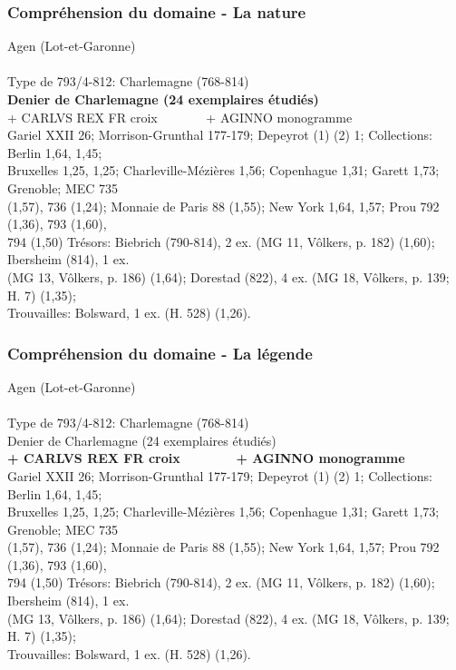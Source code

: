 \documentclass[10pt, compress]{beamer}
\begin{document}
\begin{frame}[fragile]
  \frametitle{Compréhension du domaine - La nature}
  \begin{scriptsize}
\textcolor{light_gray}{Agen (Lot-et-Garonne)}\\~\\

\textcolor{light_gray}{Type de 793/4-812: Charlemagne (768-814)}\\

\textbf{Denier de Charlemagne (24 exemplaires étudiés)}\\
\textcolor{light_gray}{
+ CARLVS REX FR croix~~~~~~~ + AGINNO monogramme\\
Gariel XXII 26; Morrison-Grunthal 177-179; Depeyrot (1) (2) 1; Collections: Berlin 1,64, 1,45; \\
Bruxelles 1,25, 1,25; Charleville-Mézières 1,56; Copenhague 1,31; Garett 1,73; Grenoble; MEC 735 \\
(1,57), 736 (1,24); Monnaie de Paris 88 (1,55); New York 1,64, 1,57; Prou 792 (1,36), 793 (1,60), \\
794 (1,50) Trésors: Biebrich (790-814), 2 ex. (MG 11, Vôlkers, p. 182) (1,60); Ibersheim (814), 1 ex. \\
(MG 13, Vôlkers, p. 186) (1,64); Dorestad (822), 4 ex. (MG 18, Vôlkers, p. 139; H. 7) (1,35); \\Trouvailles: Bolsward, 1 ex. (H. 528) (1,26).
} 
    \end{scriptsize}
\end{frame}

\begin{frame}[fragile]
  \frametitle{Compréhension du domaine - La légende}
  \begin{scriptsize}
\textcolor{light_gray}{Agen (Lot-et-Garonne)}\\~\\

\textcolor{light_gray}{Type de 793/4-812: Charlemagne (768-814)\\
Denier de Charlemagne (24 exemplaires étudiés)}\\

\textbf{+ CARLVS REX FR croix~~~~~~~ + AGINNO monogramme}\\
\textcolor{light_gray}{
Gariel XXII 26; Morrison-Grunthal 177-179; Depeyrot (1) (2) 1; Collections: Berlin 1,64, 1,45; \\
Bruxelles 1,25, 1,25; Charleville-Mézières 1,56; Copenhague 1,31; Garett 1,73; Grenoble; MEC 735 \\
(1,57), 736 (1,24); Monnaie de Paris 88 (1,55); New York 1,64, 1,57; Prou 792 (1,36), 793 (1,60), \\
794 (1,50) Trésors: Biebrich (790-814), 2 ex. (MG 11, Vôlkers, p. 182) (1,60); Ibersheim (814), 1 ex. \\
(MG 13, Vôlkers, p. 186) (1,64); Dorestad (822), 4 ex. (MG 18, Vôlkers, p. 139; H. 7) (1,35); \\
Trouvailles: Bolsward, 1 ex. (H. 528) (1,26).
} 
    \end{scriptsize}
\end{frame}
\end{document}
